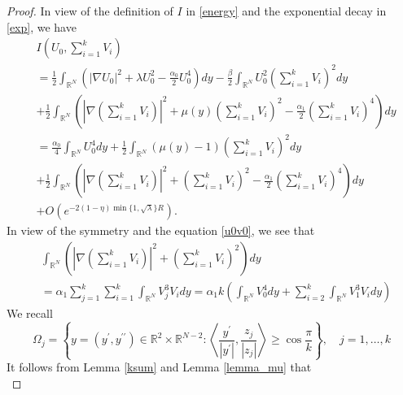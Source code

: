 \documentclass{amsart}
\theoremstyle{definition}
\theoremstyle{remark}
\numberwithin{equation}{section}
\begin{document}
\begin{proof} In view of the definition of $I$ in \eqref{energy} and the exponential decay in \eqref{exp}, we have 
\begin{equation}
\begin{aligned}\label{f1}
&I\left(U_0,  \sum_{i=1}^k V_{i}\right)\\&= \frac{1}{2} \int_{\mathbb{R}^{N}}\left(|\nabla U_0|^{2}+\lambda U_0^{2}-\frac{\alpha_0}{2} U_0^{4}\right)dy-\frac{\beta}{2}\int_{\mathbb{R}^N}U_0^{2} \left( \sum_{i=1}^k V_{i}\right)^{2} d y
\\&+
 \frac{1}{2} \int_{\mathbb{R}^{N}}\left(\left|\nabla\left( \sum_{i=1}^k V_{i}\right)\right|^{2}+\mu(y) \left( \sum_{i=1}^k V_{i}\right)^{2} -\frac{\alpha_1}{2} \left( \sum_{i=1}^k V_{i}\right)^{4}\right) d y
\\&= \frac{\alpha_0}{4} \int_{\mathbb{R}^{N}} U_0^{4}dy+
 \frac{1}{2} \int_{\mathbb{R}^{N}}\left(\mu(y)-1\right) \left( \sum_{i=1}^k V_{i}\right)^{2}  d y
\\&+
 \frac{1}{2} \int_{\mathbb{R}^{N}}\left(\left|\nabla\left( \sum_{i=1}^k V_{i}\right)\right|^{2}+ \left( \sum_{i=1}^k V_{i}\right)^{2} -\frac{\alpha_1}{2} \left( \sum_{i=1}^k V_{i}\right)^{4}\right) d y 
 \\&+O(e^{-2(1-\eta)\min\{1,\sqrt{\lambda}\}R}).
 \end{aligned}
\end{equation}In view of  the symmetry and the equation \eqref{u0v0}, we see that
\begin{equation}
\begin{aligned}\label{f2}
&\int_{\mathbb{R}^{N}}\left(\left|\nabla \left( \sum_{i=1}^k V_{i}\right)\right|^{2}+\left( \sum_{i=1}^k V_{i}\right)^{2}\right)dy\\&=\alpha_1\sum_{j=1}^{k} \sum_{i=1}^{k} \int_{\mathbb{R}^{N}} V_j^{3} V_i dy 
=\alpha_1k \left(\int_{\mathbb{R}^{N}} V_0^{4}dy+ \sum_{i=2}^{k} \int_{\mathbb{R}^{N}} V_1^{3} V_idy\right)
\end{aligned}
\end{equation}
We recall
\begin{equation}
\Omega_{j}=\left\{y=\left(y^{\prime}, y^{\prime \prime}\right) \in \mathbb{R}^{2} \times \mathbb{R}^{N-2}:\left\langle\frac{y^{\prime}}{\left|y^{\prime}\right|}, \frac{z_{j}}{\left|z_{j}\right|}\right\rangle \geq \cos \frac{\pi}{k}\right\}, \quad j=1, \ldots, k
\end{equation}
It follows from Lemma \ref{ksum}  and  Lemma \ref{lemma_mu} that
\begin{equation}

\end{equation}
\end{proof}
\end{document}
